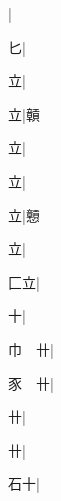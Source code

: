 \begin{multicols}{2}
{{}\mktsJzrVerticalBar{}{\cjk{}{\cnsym{}　}{\cnsym{}　}{\cnsym{}　}}|{}\par
{\cjk{}{\cnsym{}　}{\cnsym{}　}匕}\mktsJzrVerticalBar{}{\cjk{}{\cnsym{}　}{\cnsym{}　}{\cnsym{}　}}|{}\par
{\cjk{}{\cnsym{}　}{\cnsym{}　}立}|{}\par
{\cjk{}{\cnsym{}　}{\cnsym{}　}立}|{\cjk{}贑}\par
{立}|{}\par
{\cjk{}{\cnsym{}　}{\cnsym{}　}立}|{}\par
{\cjk{}{\cnsym{}　}{\cnsym{}　}立}|{\cjk{}戅}\par
{\cjk{}{\cnsym{}　}{\cnsym{}　}立}|{}\par
{\cjk{}{\cnsym{}　}匚立}|{}\par
{\cjk{}{\cnsym{}　}{\cnsym{}　}十}|{}\par
{\cjk{}巾{\cnsym{}　}卄}|{}\par
{\cjk{}豕{\cnsym{}　}卄}|{}\par
{\cjk{}{\cnsym{}　}{\cnsym{}　}卄}|{}\par
{\cjk{}{\cnsym{}　}{\cnsym{}　}卄}|{}\par
{\cjk{}{\cnsym{}　}石十}|{}\par
}
\end{multicols}
